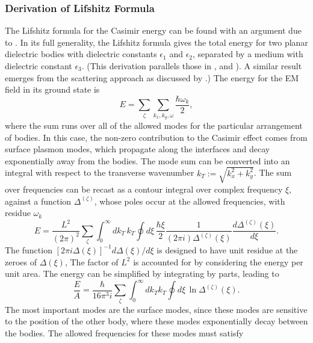 \subsubsection{Derivation of Lifshitz Formula}
\label{sec:lifshitz}
The Lifshitz formula for the Casimir energy can be found with an argument due to \citet{vanKampen1968}.
In its full generality, the Lifshitz formula gives the total energy for two planar dielectric bodies with dielectric constants 
$\epsilon_1$ and $\epsilon_2$,
separated by a medium with dielectric constant $\epsilon_3$.  
(This derivation parallels those in \citet[\S~7.2]{Milonni1994}, and \citet[Ch.~12]{Bordag2009}).
A similar result emerges from the scattering approach as discussed by \citet{Lambrecht2011}.)
The energy for the EM field in its ground state is 
\begin{equation}
  E = \sum_{\zeta}\sum_{k_x,k_y,\omega} \frac{\hbar\omega_k}{2},
\end{equation}
where the sum runs over all of the allowed modes for the particular arrangement of bodies.  
In this case, the  non-zero contribution to the Casimir effect comes from surface plasmon modes, which propagate along the interfaces
and decay exponentially away from the bodies.  
The mode sum can be converted into an integral with respect to the transverse wavenumber $k_T:=\sqrt{k_x^2+k_y^2}$.
The sum over frequencies can be recast as a contour integral over complex frequency $\xi$, against a function $\Delta^{(\zeta)}$,
 whose poles occur at the allowed frequencies, with residue $\omega_k$  
\begin{equation}
  E = \frac{L^2}{(2\pi)^2}\sum_{\zeta}\int_0^\infty dk_T\,k_T\oint d\xi\, 
  \frac{\hbar \xi}{2} \frac{1}{(2\pi i)\Delta^{(\zeta)}(\xi)}\frac{d\Delta^{(\zeta)}(\xi)}{d\xi}.
\end{equation}
The function $[2\pi i\Delta(\xi)]^{-1}d\Delta(\xi)/d\xi$ is designed to have unit residue at the zeroes of $\Delta(\xi)$, 
The factor of $L^2$ is accounted for by considering the energy per unit area.  
The energy can be simplified by integrating by parts, leading to 
\begin{equation}
  \frac{E}{A} = \frac{\hbar}{16\pi^3 i}\sum_{\zeta}\int_0^\infty dk_Tk_T\oint d\xi \, \ln\Delta^{(\zeta)}(\xi).
  \label{eq:lifshitz_logDelta}
\end{equation}
The most important modes are the surface modes, since these modes are sensitive to the position of the other body, where
these modes exponentially decay between the bodies.
The allowed frequencies for these modes must satisfy 
